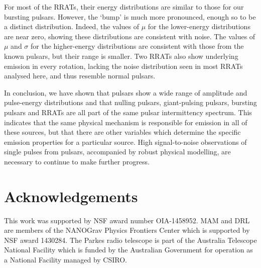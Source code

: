 \documentclass[fleqn,usenatbib]{mnras}
\begin{document}
For most of the RRATs, their energy distributions are similar to those for our bursting pulsars. 
However, the `bump' is much more pronounced, enough so to be a distinct distribution. Indeed, the 
values of $\mu$ for the lower-energy distributions are near zero, showing these distributions are consistent with noise. The values of $\mu$ and $\sigma$ for the higher-energy distributions are consistent with those from the known pulsars, but their range is smaller. Two RRATs also show underlying emission in every rotation, lacking the noise distribution seen in most RRATs analysed here, and thus resemble normal pulsars.

In conclusion, we have shown that pulsars show a wide range of amplitude and pulse-energy distributions and that nulling pulsars, giant-pulsing pulsars, bursting pulsars and RRATs are all part of the same pulsar intermittency spectrum. This indicates that the same physical mechanism is responsible for emission in all of these sources, but that there are other variables which determine the specific emission properties for a particular source. High signal-to-noise observations of single pulses from pulsars, accompanied by robust physical modelling, are necessary to continue to make further progress.

\section*{Acknowledgements}

This work was supported by NSF award number OIA-1458952. MAM and DRL are members of the NANOGrav Physics Frontiers Center which is supported by NSF award 1430284. The Parkes radio telescope is part of the Australia Telescope National Facility which is funded by the Australian Government for operation as a National Facility managed by CSIRO.

\end{document}
